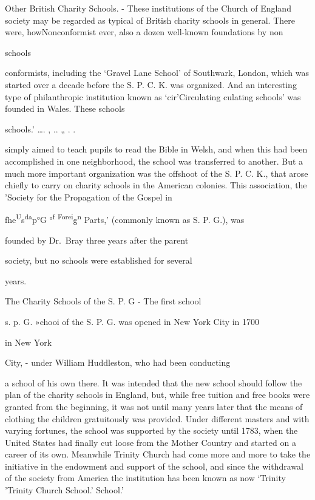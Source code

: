 \documentclass[]{book}
\begin{document}
Other British Charity Schools. - These institutions of the Church of England society may be regarded as typical of British charity schools in general. There were, how\protect\hypertarget{ch20.xmlux5cux23para.293.1.0.box.78.236.1269.43.q.60}{}{Nonconformist ever, also a dozen well-known foundations by non}

schools

conformists, including the `Gravel Lane School' of Southwark, London, which was started over a decade before the S. P. C. K. was organized. And an interesting type of philanthropic institution known as `cir'Circulating culating schools' was founded in Wales. These schools

schools.' \ldots{}. , .. „ . .

simply aimed to teach pupils to read the Bible in Welsh, and when this had been accomplished in one neighborhood, the school was transferred to another. But a much more important organization was the offshoot of the S. P. C. K., that arose chiefly to carry on charity schools in the American colonies. This association, the 'Society for the Propagation of the Gospel in

fhe\textsuperscript{U}s\textsuperscript{da}p°G °\textsuperscript{f} \textsuperscript{Forei}g\textsuperscript{n} Parts,' (commonly known as S. P. G.), was

founded by Dr.~Bray three years after the parent

society, but no schools were established for several

years.

The Charity Schools of the S. P. G - The first school

s. p. \textsc{G. }»chooi of the S. P. G. was opened in New York City in 1700

in New York

City, - under William Huddleston, who had been conducting

a school of his own there. It was intended that the new school should follow the plan of the charity schools in England, but, while free tuition and free books were granted from the beginning, it was not until many years later that the means of clothing the children gratuitously was provided. Under different masters and with varying fortunes, the school was supported by the society until 1783, when the United States had finally cut loose from the Mother Country and started on a career of its own. Meanwhile Trinity Church had come more and more to take the initiative in the endowment and support of the school, and since the withdrawal of the\protect\hypertarget{ch20.xmlux5cux23para.294.1.0.box.132.220.1232.98.q.60}{}{ society from America the institution has been known as now `Trinity 'Trinity Church School.' School.'}
\end{document}
